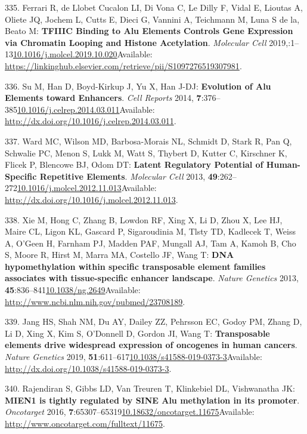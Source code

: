 \documentclass[
]{book}
\begin{document}
\leavevmode\hypertarget{ref-RobertoFerrari2019}{}%
335. Ferrari R, de Llobet Cucalon LI, Di Vona C, Le Dilly F, Vidal E, Lioutas A, Oliete JQ, Jochem L, Cutts E, Dieci G, Vannini A, Teichmann M, Luna S de la, Beato M: \textbf{TFIIIC Binding to Alu Elements Controls Gene Expression via Chromatin Looping and Histone Acetylation}. \emph{Molecular Cell} 2019,:1--13\href{https://doi.org/10.1016/j.molcel.2019.10.020}{10.1016/j.molcel.2019.10.020}Available: \url{https://linkinghub.elsevier.com/retrieve/pii/S1097276519307981}.

\leavevmode\hypertarget{ref-Su2014}{}%
336. Su M, Han D, Boyd-Kirkup J, Yu X, Han J-DJ: \textbf{Evolution of Alu Elements toward Enhancers}. \emph{Cell Reports} 2014, \textbf{7}:376--385\href{https://doi.org/10.1016/j.celrep.2014.03.011}{10.1016/j.celrep.2014.03.011}Available: \url{http://dx.doi.org/10.1016/j.celrep.2014.03.011}.

\leavevmode\hypertarget{ref-Ward2013}{}%
337. Ward MC, Wilson MD, Barbosa-Morais NL, Schmidt D, Stark R, Pan Q, Schwalie PC, Menon S, Lukk M, Watt S, Thybert D, Kutter C, Kirschner K, Flicek P, Blencowe BJ, Odom DT: \textbf{Latent Regulatory Potential of Human-Specific Repetitive Elements}. \emph{Molecular Cell} 2013, \textbf{49}:262--272\href{https://doi.org/10.1016/j.molcel.2012.11.013}{10.1016/j.molcel.2012.11.013}Available: \url{http://dx.doi.org/10.1016/j.molcel.2012.11.013}.

\leavevmode\hypertarget{ref-Xie2013}{}%
338. Xie M, Hong C, Zhang B, Lowdon RF, Xing X, Li D, Zhou X, Lee HJ, Maire CL, Ligon KL, Gascard P, Sigaroudinia M, Tlsty TD, Kadlecek T, Weiss A, O'Geen H, Farnham PJ, Madden PAF, Mungall AJ, Tam A, Kamoh B, Cho S, Moore R, Hirst M, Marra MA, Costello JF, Wang T: \textbf{DNA hypomethylation within specific transposable element families associates with tissue-specific enhancer landscape}. \emph{Nature Genetics} 2013, \textbf{45}:836--841\href{https://doi.org/10.1038/ng.2649}{10.1038/ng.2649}Available: \url{http://www.ncbi.nlm.nih.gov/pubmed/23708189}.

\leavevmode\hypertarget{ref-Jang2019}{}%
339. Jang HS, Shah NM, Du AY, Dailey ZZ, Pehrsson EC, Godoy PM, Zhang D, Li D, Xing X, Kim S, O'Donnell D, Gordon JI, Wang T: \textbf{Transposable elements drive widespread expression of oncogenes in human cancers}. \emph{Nature Genetics} 2019, \textbf{51}:611--617\href{https://doi.org/10.1038/s41588-019-0373-3}{10.1038/s41588-019-0373-3}Available: \url{http://dx.doi.org/10.1038/s41588-019-0373-3}.

\leavevmode\hypertarget{ref-Rajendiran2016}{}%
340. Rajendiran S, Gibbs LD, Van Treuren T, Klinkebiel DL, Vishwanatha JK: \textbf{MIEN1 is tightly regulated by SINE Alu methylation in its promoter}. \emph{Oncotarget} 2016, \textbf{7}:65307--65319\href{https://doi.org/10.18632/oncotarget.11675}{10.18632/oncotarget.11675}Available: \url{http://www.oncotarget.com/fulltext/11675}.
\end{document}

